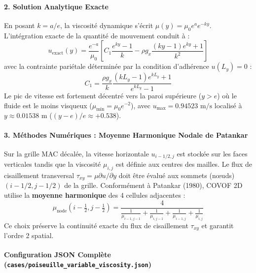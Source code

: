 \documentclass[
  10pt,
]{article}
\begin{document}
\paragraph{2. Solution Analytique
Exacte}\label{solution-analytique-exacte-1}

En posant \(k = a/e\), la viscosité dynamique s'écrit
\(\mu(y) = \mu_0 e^a e^{-k y}\). L'intégration exacte de la quantité de
mouvement conduit à :
\[u_{\text{exact}}(y) = \frac{e^{-a}}{\mu_0} \left[ C_1 \frac{e^{k y} - 1}{k} - \rho g_x \frac{(k y - 1)e^{k y} + 1}{k^2} \right]\]
avec la contrainte pariétale déterminée par la condition d'adhérence
\(u(L_y) = 0\) :
\[C_1 = \frac{\rho g_x}{k} \frac{(k L_y - 1)e^{k L_y} + 1}{e^{k L_y} - 1}\]
Le pic de vitesse est fortement décentré vers la paroi supérieure
(\(y > e\)) où le fluide est le moins visqueux
(\(\mu_{\min} = \mu_0 e^{-2}\)), avec \(u_{\max} = 0.94523\text{ m/s}\)
localisé à \(y \approx 0.01538\text{ m}\) (\((y-e)/e \approx +0.538\)).

\paragraph{3. Méthodes Numériques : Moyenne Harmonique Nodale de
Patankar}\label{muxe9thodes-numuxe9riques-moyenne-harmonique-nodale-de-patankar}

Sur la grille MAC décalée, la vitesse horizontale \(u_{i-1/2, j}\) est
stockée sur les faces verticales tandis que la viscosité \(\mu_{i, j}\)
est définie aux centres des mailles. Le flux de cisaillement transversal
\(\tau_{xy} = \mu \partial u / \partial y\) doit être évalué aux sommets
(nœuds) \((i-1/2, j-1/2)\) de la grille. Conformément à Patankar (1980),
COVOF 2D utilise la \textbf{moyenne harmonique} des 4 cellules
adjacentes :
\[\mu_{\text{node}}(i-\tfrac{1}{2}, j-\tfrac{1}{2}) = \frac{4}{\frac{1}{\mu_{i-1,j-1}} + \frac{1}{\mu_{i,j-1}} + \frac{1}{\mu_{i-1,j}} + \frac{1}{\mu_{i,j}}}\]
Ce choix préserve la continuité exacte du flux de cisaillement
\(\tau_{xy}\) et garantit l'ordre 2 spatial.

\paragraph{\texorpdfstring{Configuration JSON Complète
(\texttt{cases/poiseuille\_variable\_viscosity.json})}{Configuration JSON Complète (cases/poiseuille\_variable\_viscosity.json)}}\label{configuration-json-compluxe8te-casespoiseuille_variable_viscosity.json}
\end{document}
